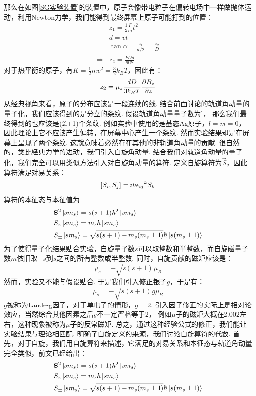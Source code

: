 那么在如图\ref{SG实验装置}的装置中，原子会像带电粒子在偏转电场中一样做抛体运动，利用Newton力学，我们能得到最终屏幕上原子可能打到的位置：
\begin{align*}
& z_{1} = \frac{1}{2}\frac{F}{m}t^2 \\
& d = vt \\
& \tan\alpha = \frac{z_{1}}{d/2} = \frac{z_{2}}{D} \\
\Longrightarrow & z_{2}  = \frac{FDd}{mv^2}
\end{align*}
对于热平衡的原子，有\(K = \frac{1}{2}mv^2=\frac{3}{2}k_{B}T\)，因此有：
\[
z_{2} = \mu_{z}\frac{dD}{3k_{B}T}\frac{\partial{B_{z}}}{\partial{z}}
\]
从经典视角来看，原子的分布应该是一段连续的线. 结合前面讨论的轨道角动量的量子化，我们应该得到的是分立的条纹. 假设轨道角动量量子数为l，
那么我们最终得到的也应该是(2l+1)个条纹. 例如实验中使用的是基态Ag原子，\(l=m=0\)，因此理论上它不应该产生偏转，在屏幕中心产生一个条纹. 
然而实验结果却是在屏幕上呈现了两个条纹. 这就意味着必然存在其他的非轨道角动量的贡献. 很自然的，类比经典力学的进动，我们引入自旋角动量. 
结合我们对轨道角动量的量子化，我们完全可以用类似方法引入对自旋角动量的算符. 定义自旋算符为\({\vec{S}}\)，因此算符满足对易关系：
\[
[S_{i},S_{j}] = i\hbar{\epsilon_{ij}}^{k}S_{k}
\]
算符的本征态与本征值为
\begin{align*}
& {\mathbf{S}}^{2}\ket{sm_{s}} = s(s+1)\hbar^2\ket{sm_{s}} \\
& {S}_{z}\ket{sm_{s}} = m_{s}\hbar\ket{sm_{s}} \\
& {S}_{\pm}\ket{sm_{s}} = \sqrt{s(s+1)-m_{s}(m_{s}\pm1)}\hbar\ket{s(m_{s}\pm1)}
\end{align*}
为了使得量子化结果贴合实验，自旋量子数\(s\)可以取整数和半整数，而自旋磁量子数\(m\)依旧取\(-s\)到\(s\)之间的所有整数或半整数. 
同时，自旋贡献的磁矩应该是：
\[
\mu_{s} =  -\sqrt{s(s+1)}\mu_{B}
\]
然而，实验又不能与假设贴合. 于是我们引入修正银子\(g\)，于是有：
\[
\mu_{s} = -\sqrt{s(s+1)}g\mu_{B}
\]
\(g\)被称为Lande-g因子，对于单电子的情形，\(g=2\). 引入因子修正的实际上是相对论效应，当然综合其他因素之后\(g\)不一定严格等于2，
例如\(\mu\)子的磁矩大概在\(2.002\)左右，这种现象被称为\(\mu\)子的反常磁矩. 总之，通过这种经验公式的修正，我们能让实验结果与理论相匹配. 
明确了自旋定义的来源，我们讨论自旋算符的代数. 首先，对于自旋，我们用自旋算符来描述，它满足的对易关系和本征态与轨道角动量完全类似，前文已经给出：
\begin{align*}
& {\mathbf{S}}^{2}\ket{sm_{s}} = s(s+1)\hbar^2\ket{sm_{s}} \\
& {S}_{z}\ket{sm_{s}} = m_{s}\hbar\ket{sm_{s}} \\
& {S}_{\pm}\ket{sm_{s}} = \sqrt{s(s+1)-m_{s}(m_{s}\pm1)}\hbar\ket{s(m_{s}\pm1)}
\end{align*}
